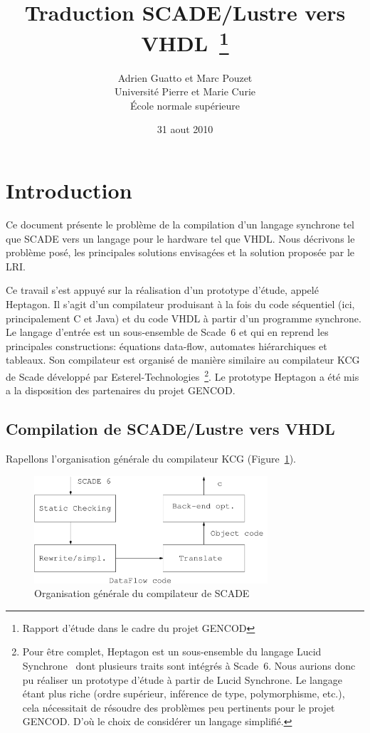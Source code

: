 \documentclass[a4paper]{article}
\title{Traduction SCADE/Lustre vers VHDL~\thanks{Rapport d'\'etude dans
    le cadre du projet GENCOD}}
\author{Adrien Guatto et Marc Pouzet
  \\ Universit\'e Pierre et Marie Curie \\
     \'Ecole normale sup\'erieure}
\date{31 aout 2010}
\newcommand{\LANG}{{\sc Heptagon}}
\newcommand{\lucy}{{\sc Lucid Synchrone}}
\begin{document}
\maketitle

\section{Introduction}
Ce document pr\'esente le probl\`eme de la compilation d'un langage synchrone
tel que SCADE vers un langage pour le hardware tel que VHDL. Nous d\'ecrivons le
probl\`eme pos\'e, les principales solutions envisag\'ees et la solution propos\'ee par
le LRI.

Ce travail s'est appuy\'e sur la r\'ealisation d'un prototype d'\'etude,
appel\'e \LANG{}. Il s'agit d'un compilateur produisant \`a la fois du
code s\'equentiel (ici, principalement C et Java) et du code VHDL \`a
partir d'un programme synchrone. Le langage d'entr\'ee est un
sous-ensemble de Scade~6 et qui en reprend les principales
constructions: \'equations data-flow, automates hi\'erarchiques et
tableaux. Son compilateur est organis\'e de mani\`ere similaire au
compilateur KCG de Scade d\'evelopp\'e par
Esterel-Technologies~\footnote{Pour \^etre complet, \LANG{} est un
  sous-ensemble du langage \lucy~\cite{lucy:manual06} dont plusieurs
  traits sont int\'egr\'es \`a Scade~6. Nous aurions donc pu
  r\'ealiser un prototype d'\'etude \`a partir de \lucy. Le
  langage \'etant plus riche (ordre sup\'erieur, inf\'erence de type,
  polymorphisme, etc.), cela n\'ecessitait de r\'esoudre des probl\`emes peu
  pertinents pour le projet GENCOD. D'o\`u le choix de consid\'erer un
  langage simplifi\'e.}.  Le prototype
\LANG{} a \'et\'e mis a la disposition des partenaires du projet GENCOD.

\subsection{Compilation de SCADE/Lustre vers VHDL}
Rapellons l'organisation g\'en\'erale du compilateur KCG (Figure~\ref{organisation-scade}).

\begin{figure}[t]
\begin{center}
\includegraphics[height=4cm]{Fig/compil-scade}
\end{center}
\caption{Organisation g\'en\'erale du compilateur de SCADE~\label{organisation-scade}}
\end{figure}
\end{document}
